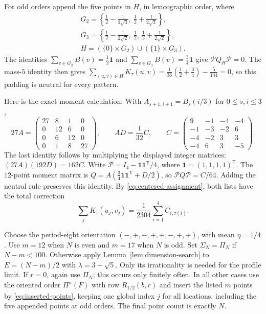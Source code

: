For odd orders append the five points in $H$, in lexicographic order, where
\[
 \begin{gathered}
 G_2=\left\{\frac12-\frac1{2\sqrt3},\ \frac12+\frac1{2\sqrt3}\right\},\\[-2pt]
 G_3=\left\{\frac12-\frac1{2\sqrt2},\ \frac12,\ \frac12+\frac1{2\sqrt2}\right\},\\[-2pt]
 H=(\{0\}\times G_2)\cup(\{1\}\times G_3).
 \end{gathered}
\]
The identities $\sum_{v\in G_2}B(v)=\frac12\mathbf1$ and
$\sum_{v\in G_3}B(v)=\frac34\mathbf1$ give $\mathcal P Q_H\mathcal P=0$.
The mass-$5$ identity then gives
$\sum_{(u,v)\in H}K_\tau(u,v)=\frac1{36}(\frac12+\frac34)-\frac5{144}=0$,
so this padding is neutral for every pattern.

Here is the exact moment calculation.  With $A_{s+1,i+1}=B_s(i/3)$ for $0\le s,i\le3$,
\[
 27A=\begin{pmatrix}27&8&1&0\\0&12&6&0\\0&6&12&0\\0&1&8&27\end{pmatrix},
 \qquad
 AD=\frac1{32}C,\qquad
 C=\begin{pmatrix}9&-1&-4&-4\\-1&-3&-2&6\\-4&-2&3&3\\-4&6&3&-5\end{pmatrix}.
\]
The last identity follows by multiplying the displayed integer matrices:
$(27A)(192D)=162C$.  Write
$\mathcal P=I_4-\mathbf1\mathbf1^{\mathsf T}/4$, where
$\mathbf1=(1,1,1,1)^{\mathsf T}$.  The $12$-point moment matrix is
$Q=A(\tfrac34\mathbf1\mathbf1^{\mathsf T}+D/2)$, so
$\mathcal P Q\mathcal P=C/64$.  Adding the neutral rule preserves this identity.  By
\eqref{eq:centered-assignment}, both lists have the total correction
\begin{equation}\label{eq:interior-correction}
 \sum_j K_\tau(u_j,v_j)=\frac1{2304}\sum_{i=1}^4C_{i,\tau(i)}.
\end{equation}

Choose the period-eight orientation
$(-,+,-,+,+,-,+,+)$, with mean $\eta=1/4$.
Use $m=12$ when $N$ is even and $m=17$ when $N$ is odd.
Set $\Sigma_N=\Pi_N$ if $N-m<100$.
Otherwise apply Lemma~\ref{lem:dimension-search} to $E=(N-m)/2$ with
$\lambda=3-\sqrt5$. Only its irrationality is needed for the profile limit.  If $r=0$, again use $\Pi_N$; this occurs
only finitely often.  In all other cases use the oriented order $\Pi^\sigma(F)$ with row
$R_{1/2}(b,r)$ and insert the listed $m$ points by
\eqref{eq:inserted-points}, keeping one global
index $j$ for all locations, including the five appended points at odd orders.
The final point count is exactly $N$.


